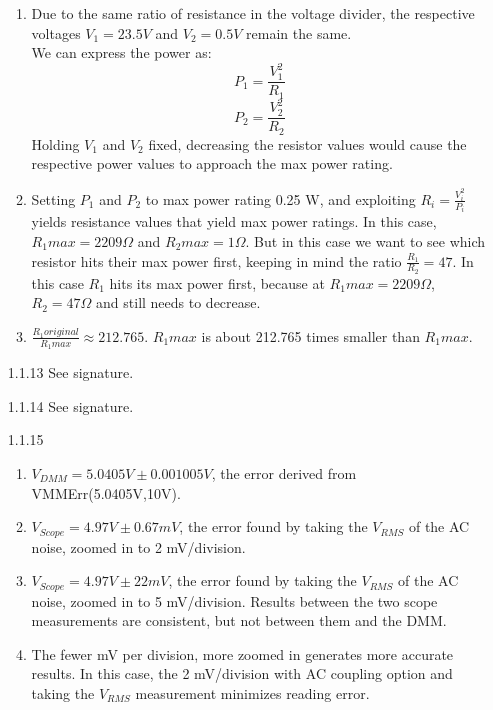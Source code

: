 \documentclass{article}
\begin{document}
\begin{itemize}
\begin{enumerate}[label=\alph*]
        \item Due to the same ratio of resistance in the voltage divider, the respective voltages $V_1 = 23.5V$ and $V_2 = 0.5V$ remain the same. \\ We can express the power as:
        \begin{equation}
            P_1 = \frac{V_1^{2}}{R_1}
        \end{equation}
        \begin{equation}
            P_2 = \frac{V_2^{2}}{R_2}
        \end{equation}
        Holding $V_1$ and $V_2$ fixed, decreasing the resistor values would cause the respective power values to approach the max power rating.
        \item Setting $P_1$ and $P_2$ to max power rating 0.25 W, and exploiting $R_i = \frac{V_i^{2}}{P_i}$ yields resistance values that yield max power ratings. In this case, $R_1 max = 2209 \Omega$ and $R_2 max = 1 \Omega$. But in this case we want to see which resistor hits their max power first, keeping in mind the ratio $\frac{R_1}{R_2} = 47$. In this case $R_1$ hits its max power first, because at $R_1 max = 2209 \Omega$, $R_2 = 47 \Omega$ and still needs to decrease.
        \item $\frac{R_1 original}{R_1 max} \approx 212.765$. $R_1 max$ is about 212.765 times smaller than $R_1 max$.
    \end{enumerate}
    \item[1.1.13] See signature.
    \item[1.1.14] See signature.
    \item[1.1.15] 
        \begin{enumerate}[label=\alph*]
        \item $V_{DMM} = 5.0405V \pm 0.001005V$, the error derived from VMMErr(5.0405V,10V).
        \item $V_{Scope} = 4.97V \pm 0.67 mV$, the error found by taking the $V_{RMS}$ of the AC noise, zoomed in to 2 mV/division.
        \item $V_{Scope} = 4.97V \pm 22 mV$, the error found by taking the $V_{RMS}$ of the AC noise, zoomed in to 5 mV/division. Results between the two scope measurements are consistent, but not between them and the DMM.
        \item The fewer mV per division, more zoomed in generates more accurate results. In this case, the 2 mV/division with AC coupling option and taking the $V_{RMS}$ measurement minimizes reading error.
        \end{enumerate}

\end{itemize}
\end{document}

